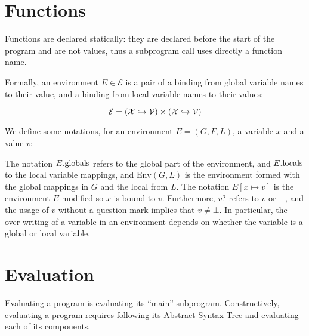 \documentclass{book}
\begin{document}
\section{Functions}
Functions are declared statically: they are declared before the start of the
program and are not values, thus a subprogram call uses directly a function name.

Formally, an environment $E \in \mathcal{E}$ is a pair of a binding from global
variable names to their value, and a binding from local variable names to their
values:

%
\[
  \mathcal{E} = \left( \mathcal{X} \hookrightarrow \mathcal{V} \right)
         \times \left( \mathcal{X} \hookrightarrow \mathcal{V} \right)
\]

We define some notations, for an environment $E = (G, F, L)$, a variable $x$
and a value $v$:
%
%
The notation $E.\text{globals}$ refers to the global part of the environment, and
$E.\text{locals}$ to the local variable mappings, and $\text{Env} (G, L)$ is the
environment formed with the global mappings in $G$ and the local from $L$.
%
The notation $E[x \mapsto v]$ is the environment $E$ modified so $x$ is bound
to $v$.
%
Furthermore, $v?$ refers to $v$ or $\bot$, and the usage of $v$ without a
question mark implies that $v \neq \bot$.
%
In particular, the over-writing of a variable in an environment depends on
whether the variable is a global or local variable.

\section{Evaluation}

Evaluating a program is evaluating its ``main'' subprogram.
Constructively, evaluating a program requires following its
Abstract Syntax Tree and evaluating each of its components.
\end{document}
